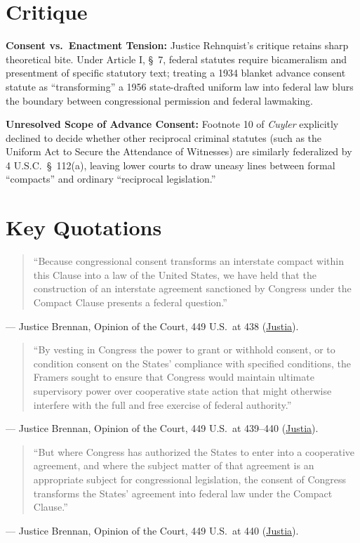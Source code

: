 \documentclass[12pt]{article}
\begin{document}
\section{Critique}
\textbf{Consent vs.\ Enactment Tension:} Justice Rehnquist's critique retains sharp theoretical bite. Under Article I, \S\ 7, federal statutes require bicameralism and presentment of specific statutory text; treating a 1934 blanket advance consent statute as ``transforming'' a 1956 state-drafted uniform law into federal law blurs the boundary between congressional permission and federal lawmaking.

\textbf{Unresolved Scope of Advance Consent:} Footnote 10 of \textit{Cuyler} explicitly declined to decide whether other reciprocal criminal statutes (such as the Uniform Act to Secure the Attendance of Witnesses) are similarly federalized by 4 U.S.C.\ \S\ 112(a), leaving lower courts to draw uneasy lines between formal ``compacts'' and ordinary ``reciprocal legislation.''

\section{Key Quotations}
\begin{quote}
``Because congressional consent transforms an interstate compact within this Clause into a law of the United States, we have held that the construction of an interstate agreement sanctioned by Congress under the Compact Clause presents a federal question.''
\end{quote}
\noindent --- Justice Brennan, Opinion of the Court, 449 U.S.\ at 438 (\href{https://supreme.justia.com/cases/federal/us/449/433/}{Justia}).

\begin{quote}
``By vesting in Congress the power to grant or withhold consent, or to condition consent on the States' compliance with specified conditions, the Framers sought to ensure that Congress would maintain ultimate supervisory power over cooperative state action that might otherwise interfere with the full and free exercise of federal authority.''
\end{quote}
\noindent --- Justice Brennan, Opinion of the Court, 449 U.S.\ at 439--440 (\href{https://supreme.justia.com/cases/federal/us/449/433/}{Justia}).

\begin{quote}
``But where Congress has authorized the States to enter into a cooperative agreement, and where the subject matter of that agreement is an appropriate subject for congressional legislation, the consent of Congress transforms the States' agreement into federal law under the Compact Clause.''
\end{quote}
\noindent --- Justice Brennan, Opinion of the Court, 449 U.S.\ at 440 (\href{https://supreme.justia.com/cases/federal/us/449/433/}{Justia}).
\end{document}
